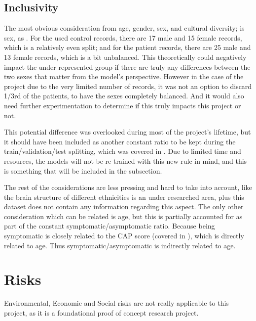 \subsection{Inclusivity}
\label{sec:inclusive}

The most obvious consideration from age, gender, sex, and cultural diversity; is sex, as . For the used control records, there are 17 male and 15 female records, which is a relatively even split; and for the patient records, there are 25 male and 13 female records, which is a bit unbalanced. This theoretically could negatively impact the under represented group if there are truly any differences between the two sexes that matter from the model's perspective. However in the case of the project due to the very limited number of records, it was not an option to discard 1/3rd of the patients, to have the sexes completely balanced. And it would also need further experimentation to determine if this truly impacts this project or not.\par
This potential difference was overlooked during most of the project's lifetime, but it should have been included as another constant ratio to be kept during the train/validation/test splitting, which was covered in . Due to limited time and resources, the models will not be re-trained with this new rule in mind, and this is something that will be included in the  subsection.\par
The rest of the considerations are less pressing and hard to take into account, like the brain structure of different ethnicities is an under researched area, plus this dataset does not contain any information regarding this aspect. The only other consideration which can be related is age, but this is partially accounted for as part of the constant symptomatic/asymptomatic ratio. Because being symptomatic is closely related to the \ac{CAP} score (covered in ), which is directly related to age. Thus symptomatic/asymptomatic is indirectly related to age.

\section{Risks}

Environmental, Economic and Social risks are not really applicable to this project, as it is a foundational proof of concept research project.








